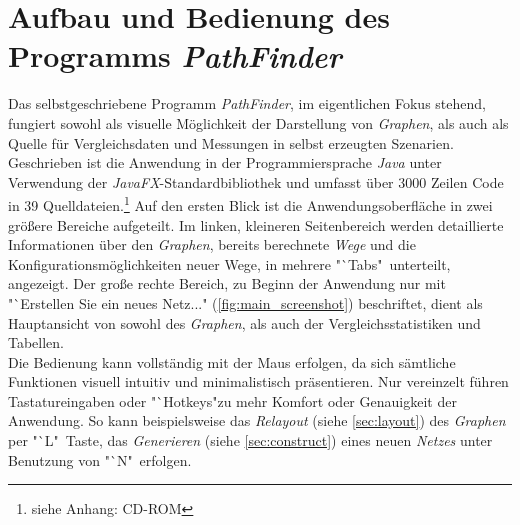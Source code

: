 \documentclass[12pt]{article}
\begin{document}
\section{Aufbau und Bedienung des Programms \textit{PathFinder}}
\label{sec:manual}
Das selbstgeschriebene Programm \textit{PathFinder}, im eigentlichen Fokus stehend, fungiert sowohl als visuelle Möglichkeit der Darstellung von \textit{Graphen}, als auch als Quelle für Vergleichsdaten und Messungen in selbst erzeugten Szenarien. Geschrieben ist die Anwendung in der Programmiersprache \textit{Java} unter Verwendung der \textit{JavaFX}-Standardbibliothek \cite{javafx} und umfasst über 3000 Zeilen Code in 39 Quelldateien.\footnote{siehe Anhang: CD-ROM}
Auf den ersten Blick ist die Anwendungsoberfläche in zwei größere Bereiche aufgeteilt. Im linken, kleineren Seitenbereich werden detaillierte Informationen über den \textit{Graphen}, bereits berechnete \textit{Wege} und die Konfigurationsmöglichkeiten neuer Wege, in mehrere "`Tabs"\ unterteilt, angezeigt. Der große rechte Bereich, zu Beginn der Anwendung nur mit "`Erstellen Sie ein neues Netz..." (\autoref{fig:main_screenshot}) beschriftet, dient als Hauptansicht von sowohl des \textit{Graphen}, als auch der Vergleichsstatistiken und Tabellen.
\\
Die Bedienung kann vollständig mit der Maus erfolgen, da sich sämtliche Funktionen visuell intuitiv und minimalistisch präsentieren. Nur vereinzelt führen Tastatureingaben oder "`Hotkeys"\;zu mehr Komfort oder Genauigkeit der Anwendung. So kann beispielsweise das \textit{Relayout} (siehe \autoref{sec:layout}) des \textit{Graphen} per "`L"\ Taste, das \textit{Generieren} (siehe \autoref{sec:construct}) eines neuen \textit{Netzes} unter Benutzung von "`N"\ erfolgen.
\end{document}

